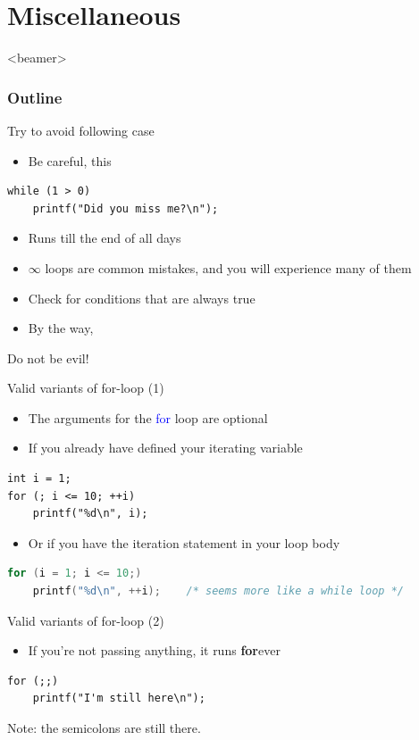 \section{Miscellaneous}
\label{sec:misc}
\begin{frame}<beamer>
    \frametitle{Outline}
    \tableofcontents[currentsection]
\end{frame}

\begin{frame}[fragile]{Try to avoid following case}
\begin{itemize}
	\item {Be careful, this}
\end{itemize}

\begin{lstlisting}
while (1 > 0)
	printf("Did you miss me?\n");
\end{lstlisting}
\begin{itemize}
	\item {Runs till the end of all days}
    \item {$\infty$ loops are common mistakes, and you will experience many of them}
	\item {Check for conditions that are always true}
	\item {By the way,}
\end{itemize}
\begin{center}
 \Huge {Do not be evil!}
\end{center}
\end{frame}

\begin{frame}[fragile]{Valid variants of for-loop (1)}
\begin{itemize}
	\item {The arguments for the \textcolor{blue}{for} loop are optional}
	\item {If you already have defined your iterating variable}
\end{itemize}
	\begin{lstlisting}[numbers=none]
int i = 1;
for (; i <= 10; ++i)
	printf("%d\n", i);
\end{lstlisting}

\begin{itemize}
	\item {Or if you have the iteration statement in your loop body}
\end{itemize}
	\begin{lstlisting}[numbers=none, language=c]
for (i = 1; i <= 10;)
	printf("%d\n", ++i);	/* seems more like a while loop */
\end{lstlisting}
\end{frame}

\begin{frame}[fragile]{Valid variants of for-loop (2)}
\begin{itemize}
	\item {If you're not passing anything, it runs \textbf{for}ever}
\end{itemize}
	\begin{lstlisting}[numbers=none]
for (;;)
	printf("I'm still here\n");
\end{lstlisting}
Note: the semicolons are still there.
\end{frame}



